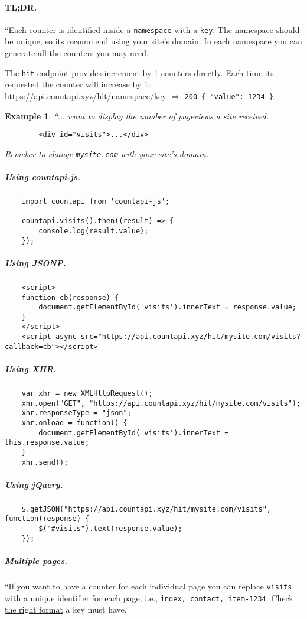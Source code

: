\documentclass{article}
\numberwithin{equation}{section}
\newtheorem{example}{Example}[section]
\begin{document}
\paragraph{TL;DR.} ``Each counter is identified inside a \texttt{namespace} with a \texttt{key}. The namespace should be unique, so its recommend using your site's domain. In each namespace you can generate all the counters you may need.

The \texttt{hit} endpoint provides increment by 1 counters directly. Each time its requested the counter will increase by 1: \url{https://api.countapi.xyz/hit/namespace/key} $\Rightarrow$ \verb|200 { "value": 1234 }|.

\begin{example}
	``$\ldots$ want to display the number of pageviews a site received.	
	\begin{verbatim}
		<div id="visits">...</div>
	\end{verbatim}
	Remeber to change \verb|mysite.com| with your site's domain.
\end{example}

\subparagraph{Using countapi-js.}
\begin{verbatim}
	import countapi from 'countapi-js';
	
	countapi.visits().then((result) => {
	    console.log(result.value);
	});
\end{verbatim}

\subparagraph{Using JSONP.}
\begin{verbatim}
	<script>
	function cb(response) {
	    document.getElementById('visits').innerText = response.value;
	}
	</script>
	<script async src="https://api.countapi.xyz/hit/mysite.com/visits?callback=cb"></script>
\end{verbatim}

\subparagraph{Using XHR.}
\begin{verbatim}
	var xhr = new XMLHttpRequest();
	xhr.open("GET", "https://api.countapi.xyz/hit/mysite.com/visits");
	xhr.responseType = "json";
	xhr.onload = function() {
	    document.getElementById('visits').innerText = this.response.value;
	}
	xhr.send();
\end{verbatim}

\subparagraph{Using jQuery.}
\begin{verbatim}
	$.getJSON("https://api.countapi.xyz/hit/mysite.com/visits", function(response) {
	    $("#visits").text(response.value);
	});
\end{verbatim}

\subparagraph{Multiple pages.} ``If you want to have a counter for each individual page you can replace \texttt{visits} with a unique identifier for each page, i.e., \texttt{index, contact, item-1234}. Check \href{https://countapi.xyz/#format}{the right format} a key must have.
\end{document}

